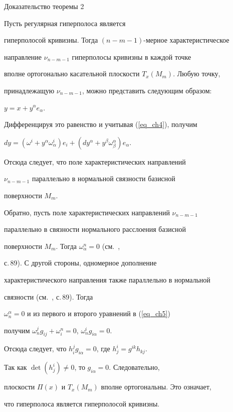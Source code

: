 \begin{pf*}{Доказательство теоремы 2}


Пусть регулярная гиперполоса является


гиперполосой кривизны. Тогда $(n-m-1)$-мерное характеристическое


направление $\nu_{n-m-1}$ гиперполосы кривизны в каждой точке


вполне ортогонально касательной плоскости $T_x(M_m)$. Любую точку,


принадлежащую $\nu_{n-m-1}$, можно представить следующим образом:


$y=x+y^{\alpha}e_{\alpha}$.


Дифференцируя это равенство и учитывая (\ref{eq_ch4}), получим


$dy=(\omega^i+y^{\alpha}\omega^i_{\alpha})e_i+


(dy^{\alpha}+y^{\beta}\omega^{\alpha}_{\beta})e_{\alpha}$.


Отсюда следует, что поле характеристических направлений


$\nu_{n-m-1}$ параллельно в нормальной связности базисной


поверхности $M_m$.





Обратно, пусть поле характеристических направлений $\nu_{n-m-1}$


параллельно в связности нормального расслоения базисной


поверхности $M_m$. Тогда $\omega^n_{\alpha}=0$ (см.~\cite{chak4},


с.\,89). С другой стороны, одномерное дополнение


характеристического направления также параллельно в нормальной


связности (см.~\cite{chak4}, с.\,89). Тогда


$\omega_n^{\alpha}=0$ и из первого и второго уравнений в (\ref{eq_ch5}) 


получим $\omega^j_ng_{ij}+\omega^n_i=0$, $\omega^i_ng_{i\alpha}=0$. 


Отсюда следует, что $h^j_ig_{i\alpha}=0$, где $h^i_j=g^{ik}h_{kj}$. 


Так как $\det(h^i_j)\neq 0$, то $g_{i\alpha}=0$. Следовательно, 


плоскости $\Pi (x)$ и $T_x(M_m)$ вполне ортогональны. Это означает, 


что гиперполоса является гиперполосой кривизны.


\end{pf*}






